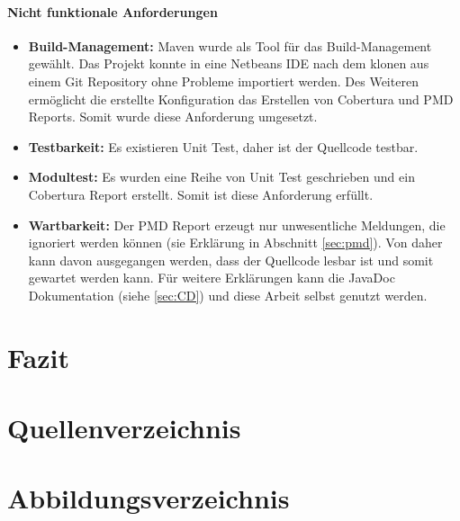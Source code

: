 \documentclass[a4paper]{article}
\begin{document}
	\paragraph{Nicht funktionale Anforderungen}
	\begin{itemize}
		\item \textbf{Build-Management:} Maven wurde als Tool für das
		Build-Management gewählt. Das Projekt konnte in eine Netbeans IDE
		nach dem klonen aus einem Git Repository ohne Probleme importiert werden.
		Des Weiteren ermöglicht die erstellte Konfiguration das Erstellen von
		Cobertura und PMD Reports. Somit wurde diese Anforderung umgesetzt.
		\item \textbf{Testbarkeit:} Es existieren Unit Test, daher ist der Quellcode
		testbar.
		\item \textbf{Modultest:} Es wurden eine Reihe von Unit Test geschrieben und
		ein Cobertura Report erstellt. Somit ist diese Anforderung erfüllt.
		\item \textbf{Wartbarkeit:} Der PMD Report erzeugt nur unwesentliche
		Meldungen, die ignoriert werden können (sie Erklärung in Abschnitt
		\ref{sec:pmd}). Von daher kann davon ausgegangen werden, dass der Quellcode
		lesbar ist und somit gewartet werden kann. Für weitere Erklärungen kann
		die JavaDoc Dokumentation (siehe \autoref{sec:CD}) und diese Arbeit selbst
		genutzt werden.
	\end{itemize} 
	
	\newpage
	\section{Fazit}
	
	\newpage
	\section{Quellenverzeichnis}	
	
	\printbibliography[type=article,heading=subbibliography,title={Artikel}]
	\printbibliography[type=book,heading=subbibliography,title={Bücher}]
	\printbibliography[type=manual,heading=subbibliography,title={Handbücher}]
	\printbibliography[type=misc,heading=subbibliography,title={Publikationen}] 			\printbibliography[type=report,heading=subbibliography,title={Spezifikationen}]
	\printbibliography[type=online,heading=subbibliography,title={Webseiten}]

	\newpage
	\section{Abbildungsverzeichnis}
	\makeatletter
	\makeatother
		
\end{document}
